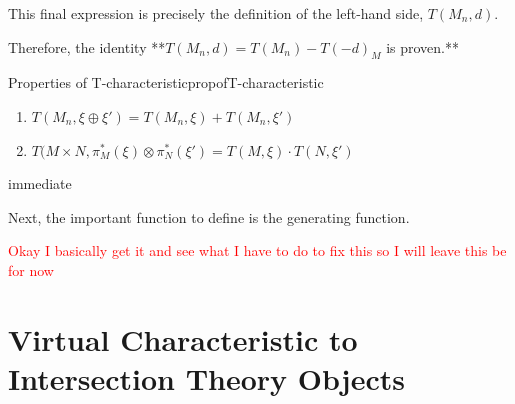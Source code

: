 \documentclass{book}
\begin{document}
\begin{Proof}
This final expression is precisely the definition of the left-hand side, $T(M_n, d)$.

Therefore, the identity **\(T(M_n, d) = T(M_n) - T(-d)_M\) is proven.**
\end{Proof}

\begin{prop}{Properties of T-characteristic}{propofT-characteristic}
  \begin{enumerate}
    \item $T(M_n, \xi\oplus \xi') = T(M_n, \xi) + T(M_n, \xi')$
    \item $T(M\times N, \pi_M^*(\xi)\otimes \pi_N^*(\xi') = T(M, \xi)\cdot T(N, \xi')$
  \end{enumerate}
\end{prop}

\begin{Proof}
  immediate
\end{Proof}

Next, the important function to define is the generating function.


\textcolor{red}{Okay I basically get it and see what I have to do to fix this so I will leave this be for now}



\section{Virtual Characteristic to Intersection Theory Objects}











\newpage
\printindex
\printbibliography
\end{document}
